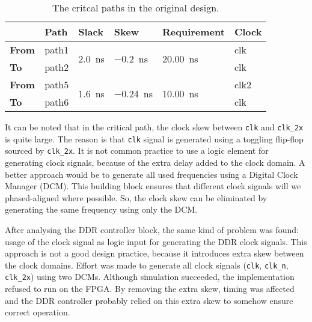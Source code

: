 \documentclass[final]{article}
\begin{document}
\begin{table}[H]
\centering
\caption{The critcal paths in the original design.}
\label{tab:crit-path-orig}
\begin{tabular}{llllll}
    \toprule
         & \textbf{Path}  & \textbf{Slack}                     & \textbf{Skew}                       & \textbf{Requirement}                & \textbf{Clock} \\ 
    \midrule
    \textbf{From} & path1 & \multirow{2}{*}{\SI{2.0}{\nano\second}} & \multirow{2}{*}{\SI{-0.2}{\nano\second}}  & \multirow{2}{*}{\SI{20.00}{\nano\second}} & clk   \\
    \textbf{To}   & path2 &                           &                             &                            & clk   \\ 
    \midrule
    \textbf{From} & path5 & \multirow{2}{*}{\SI{1.6}{\nano\second}} & \multirow{2}{*}{\SI{-0.24}{\nano\second}} & \multirow{2}{*}{\SI{10.00}{\nano\second}} & clk2  \\
    \textbf{To}   & path6 &                           &                             &                            & clk   \\ 
    \bottomrule
\end{tabular}
\end{table}

It can be noted that in the critical path, the clock skew between \texttt{clk} and \texttt{clk\_2x} is quite large.
The reason is that \texttt{clk} signal is generated using a toggling flip-flop sourced by \texttt{clk\_2x}.
It is not common practice to use a logic element for generating clock signals, because of the extra delay added to the clock domain.
A better approach would be to generate all used frequencies using a Digital Clock Manager (DCM).
This building block ensures that different clock signals will we phased-aligned where possible.
So, the clock skew can be eliminated by generating the same frequency using only the DCM.

After analysing the DDR controller block, the same kind of problem was found: usage of the clock signal as logic input for generating the DDR clock signals.
This approach is not a good design practice, because it introduces extra skew between the clock domains.
Effort was made to generate all clock signals (\texttt{clk}, \texttt{clk\_n}, \texttt{clk\_2x}) using two DCMs.
Although simulation succeeded, the implementation refused to run on the FPGA.
By removing the extra skew, timing was affected and the DDR controller probably relied on this extra skew to somehow ensure correct operation.
\end{document}
